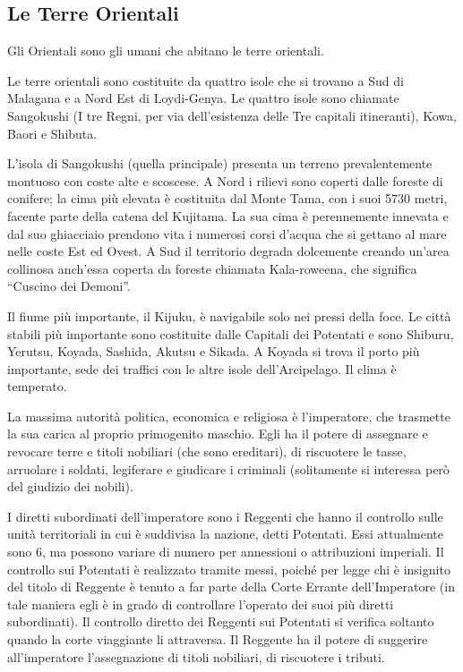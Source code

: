 \subsection{Le Terre Orientali}


Gli Orientali sono gli umani che abitano le terre orientali.

\Geografia Le terre orientali sono costituite da quattro isole che si
trovano a Sud di Malagana e a Nord Est di Loydi-Genya. Le quattro
isole sono chiamate Sangokushi (I tre Regni, per via dell'esistenza
delle Tre capitali itineranti), Kowa, Baori e Shibuta.

L'isola di Sangokushi (quella principale) presenta un terreno
prevalentemente montuoso con coste alte e scoscese. A Nord i rilievi
sono coperti dalle foreste di conifere; la cima pi\`u elevata \`e
costituita dal Monte Tama, con i suoi 5730 metri, facente parte della
catena del Kujitama. La sua cima \`e perennemente innevata e dal suo
ghiacciaio prendono vita i numerosi corsi d'acqua che si gettano al
mare nelle coste Est ed Ovest. A Sud il territorio degrada dolcemente
creando un'area collinosa anch'essa coperta da foreste chiamata
Kala-roweena, che significa ``Cuscino dei Demoni''.

Il fiume pi\`u importante, il Kijuku, \`e navigabile solo nei pressi
della foce. Le citt\`a stabili pi\`u importante sono costituite dalle
Capitali dei Potentati e sono Shiburu, Yerutsu, Koyada, Sashida,
Akutsu e Sikada. A Koyada si trova il porto pi\`u importante, sede dei
traffici con le altre isole dell'Arcipelago. Il clima \`e temperato.

\Politica La massima autorit\`a politica, economica e religiosa \`e
l'imperatore, che trasmette la sua carica al proprio primogenito
maschio. Egli ha il potere di assegnare e revocare terre e titoli
nobiliari (che sono ereditari), di riscuotere le tasse, arruolare i
soldati, legiferare e giudicare i criminali (solitamente si interessa
per\`o del giudizio dei nobili).

I diretti subordinati dell'imperatore sono i Reggenti che hanno il
controllo sulle unit\`a territoriali in cui \`e suddivisa la nazione,
detti Potentati.  Essi attualmente sono 6, ma possono variare di
numero per annessioni o attribuzioni imperiali. Il controllo sui
Potentati \`e realizzato tramite messi, poich\'e per legge chi \`e
insignito del titolo di Reggente \`e tenuto a far parte della Corte
Errante dell'Imperatore (in tale maniera egli \`e in grado di
controllare l'operato dei suoi pi\`u diretti subordinati). Il
controllo diretto dei Reggenti sui Potentati si verifica soltanto
quando la corte viaggiante li attraversa. Il Reggente ha il potere di
suggerire all'imperatore l'assegnazione di titoli nobiliari, di
riscuotere i tributi.

